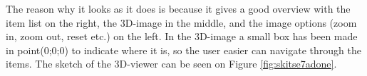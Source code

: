 The reason why it looks as it does is because it gives a good overview with the item list on the right, the 3D-image in the middle, and the image options (zoom in, zoom out, reset etc.) on the left.
In the 3D-image a small box has been made in point(0;0;0) to indicate where it is, so the user easier can navigate through the items.
The sketch of the 3D-viewer can be seen on Figure \ref{fig:skitse7adone}.